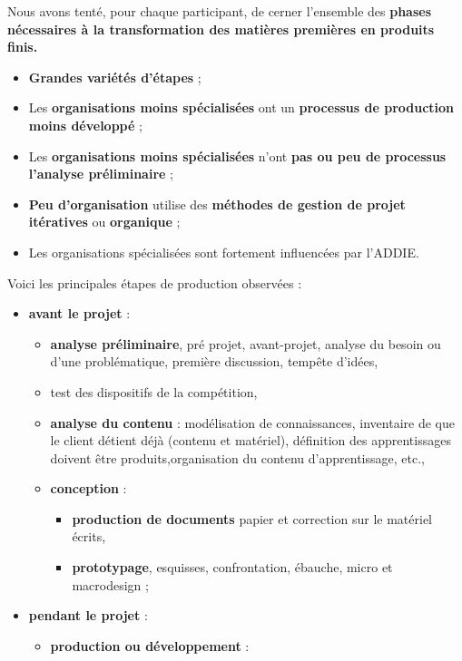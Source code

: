 \begin{frame}[allowframebreaks]
                   			
                        			Nous avons tenté, pour chaque participant, de cerner l’ensemble des \textbf{phases nécessaires à la transformation des matières premières en produits finis.}
						\begin{itemize}
						\framebreak
						\item \textbf{Grandes variétés d'étapes} ;
						\item Les \textbf{organisations moins spécialisées} ont un \textbf{processus de production moins développé} ;
						\item Les \textbf{organisations moins spécialisées} n'ont \textbf{pas ou peu de processus l'analyse préliminaire} ;
						\item \textbf{Peu d'organisation} utilise des \textbf{méthodes de gestion de projet itératives} ou \textbf{organique };
						\item Les organisations spécialisées sont fortement influencées par l'ADDIE.
						\end{itemize}
						\framebreak
						Voici les principales étapes de production observées :	
						\begin{itemize}
						\item \textbf{avant le projet} : 
							\begin{itemize}
							\item \textbf{analyse préliminaire}, pré projet, avant-projet, analyse du besoin ou d'une problématique, première discussion, tempête d’idées, 
							\item test des dispositifs de la compétition, 
							\item \textbf{analyse du contenu} : modélisation de connaissances, inventaire de que le client détient déjà (contenu et matériel), définition des apprentissages doivent être produits,organisation du contenu d’apprentissage, etc.,
							\item \textbf{conception} :
								\begin{itemize}
								\item \textbf{production de documents} papier et  correction sur le matériel écrits,
								\item \textbf{prototypage}, esquisses, confrontation, ébauche, micro et macrodesign ;
								\end{itemize}
							\end{itemize}
						\framebreak
						\item \textbf{pendant le projet }:
							\begin{itemize}
							\item \textbf{production ou développement} :

\end{itemize}
\end{itemize}
\end{frame}
